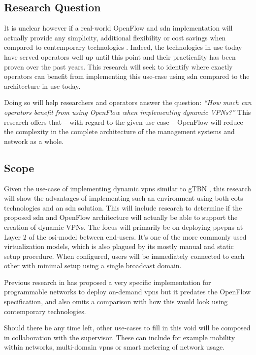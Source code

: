 	\subsection*{Research Question} %
	\label{sub:research_question}
	It is unclear however if a real-world OpenFlow and \ac{sdn} implementation will actually provide any simplicity, additional flexibility or cost savings when compared to contemporary technologies \cite{programmability-answer}. Indeed, the technologies in use today have served operators well up until this point and their practicality has been proven over the past years. 
	This research will seek to identify where exactly operators can benefit from implementing this use-case using \ac{sdn} compared to the architecture in use today. 

	Doing so will help researchers and operators answer the question: \textsl{``How much can operators benefit from using OpenFlow when implementing dynamic VPNs?''}
	This research offers that -- with regard to the given use case -- OpenFlow will reduce the complexity in the complete architecture of the management systems and network as a whole.


	\subsection*{Scope} %
	\label{sub:scope}
	Given the use-case of implementing dynamic \acp{vpn} similar to gTBN \cite{gtbn}, this research will show the advantages of implementing such an environment using both \ac{cots} technologies and an \ac{sdn} solution. This will include research to determine if the proposed \ac{sdn} and OpenFlow architecture will actually be able to support the creation of dynamic VPNs. The focus will primarily be on deploying \acp{ppvpn} at Layer 2 of the \acs{osi}-model between end-users. It's one of the more commonly used virtualization models, which is also plagued by its mostly manual and static setup procedure. When configured, users will be immediately connected to each other with minimal setup using a single broadcast domain.
	
	Previous research in \cite{net-prog-vpn} has proposed a very specific implementation for programmable networks to deploy on-demand \acp{vpn} but it predates the OpenFlow specification, and also omits a comparison with how this would look using contemporary technologies.

	Should there be any time left, other use-cases to fill in this void will be composed in collaboration with the supervisor. These can include for example mobility within networks, multi-domain \acp{vpn} or smart metering of network usage.

